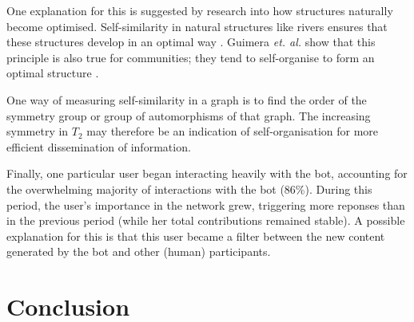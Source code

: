 \documentclass{sig-alternate}
\begin{document}
One explanation for this is suggested by research into how structures naturally become optimised. Self-similarity in natural structures like rivers ensures that these structures develop in an optimal way \cite{murray:min}. Guimera \emph{et. al.} show that this principle is also true for communities; they tend to self-organise to form an optimal structure \cite{guimera:comm}.

One way of measuring self-similarity in a graph is to find the order of the symmetry group or group of automorphisms of that graph. The increasing symmetry in $T_2$ may therefore be an indication of self-organisation for more efficient dissemination of information.

Finally, one particular user began interacting heavily with the bot, accounting for the overwhelming majority of interactions with the bot (86\%). During this period, the user's importance in the network grew, triggering more reponses than in the previous period (while her total contributions remained stable). A possible explanation for this is that this user became a filter between the new content generated by the bot and other (human) participants.

\section{Conclusion}


\end{document}

